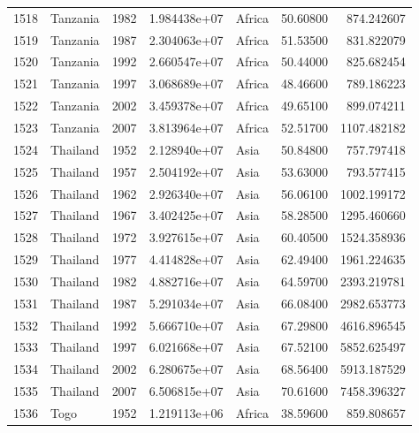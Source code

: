 \documentclass[
  letterpaper,
  DIV=11,
  numbers=noendperiod]{scrreprt}
\begin{document}
\begin{tabular}{llrrlrr}
1518 &                  Tanzania &  1982 &  1.984438e+07 &    Africa &  50.60800 &     874.242607 \\
1519 &                  Tanzania &  1987 &  2.304063e+07 &    Africa &  51.53500 &     831.822079 \\
1520 &                  Tanzania &  1992 &  2.660547e+07 &    Africa &  50.44000 &     825.682454 \\
1521 &                  Tanzania &  1997 &  3.068689e+07 &    Africa &  48.46600 &     789.186223 \\
1522 &                  Tanzania &  2002 &  3.459378e+07 &    Africa &  49.65100 &     899.074211 \\
1523 &                  Tanzania &  2007 &  3.813964e+07 &    Africa &  52.51700 &    1107.482182 \\
1524 &                  Thailand &  1952 &  2.128940e+07 &      Asia &  50.84800 &     757.797418 \\
1525 &                  Thailand &  1957 &  2.504192e+07 &      Asia &  53.63000 &     793.577415 \\
1526 &                  Thailand &  1962 &  2.926340e+07 &      Asia &  56.06100 &    1002.199172 \\
1527 &                  Thailand &  1967 &  3.402425e+07 &      Asia &  58.28500 &    1295.460660 \\
1528 &                  Thailand &  1972 &  3.927615e+07 &      Asia &  60.40500 &    1524.358936 \\
1529 &                  Thailand &  1977 &  4.414828e+07 &      Asia &  62.49400 &    1961.224635 \\
1530 &                  Thailand &  1982 &  4.882716e+07 &      Asia &  64.59700 &    2393.219781 \\
1531 &                  Thailand &  1987 &  5.291034e+07 &      Asia &  66.08400 &    2982.653773 \\
1532 &                  Thailand &  1992 &  5.666710e+07 &      Asia &  67.29800 &    4616.896545 \\
1533 &                  Thailand &  1997 &  6.021668e+07 &      Asia &  67.52100 &    5852.625497 \\
1534 &                  Thailand &  2002 &  6.280675e+07 &      Asia &  68.56400 &    5913.187529 \\
1535 &                  Thailand &  2007 &  6.506815e+07 &      Asia &  70.61600 &    7458.396327 \\
1536 &                      Togo &  1952 &  1.219113e+06 &    Africa &  38.59600 &     859.808657 \\

\end{tabular}
\end{document}
